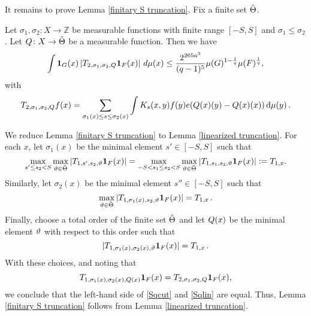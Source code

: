 It remains to prove Lemma \ref{finitary S truncation}.
Fix a finite set
$\tilde{\Theta}$.
\begin{lemma}\label{linearized truncation}
Let $\sigma_1,\sigma_2\colon X\to \mathbb{Z}$ be measurable functions with finite range
$[-S,S]$ and $\sigma_1\leq \sigma_2$.
Let ${Q}\colon X\to {\tilde{\Theta}}$ be a measurable function. Then we have
\begin{equation}  \label{Sqlin}
    \int \mathbf{1}_{G}(x)
    \left| {T}_{2,\sigma_1,\sigma_2,{Q}}\mathbf{1}_F(x)\right|\, d\mu(x)
    \le \frac{2^{265a^3}}{(q-1)^5} \mu(G)^{1-\frac{1}{q}} \mu(F)^{\frac{1}{q}},
\end{equation}
with
\begin{equation}\label{middles1}
    {T}_{2,\sigma_1,\sigma_2,{Q}}f(x)=\sum_{\sigma_1(x) \le s\le \sigma_2(x)}
    \int K_s(x,y)  f(y) e({Q}(x)(y) - {Q}(x)(x)) \, \mathrm{d}\mu(y)\,.
\end{equation}
\end{lemma}

We reduce Lemma \ref{finitary S truncation}  to
Lemma \ref{linearized truncation}.
For each $x$, let $\sigma_1(x)$ be the
minimal element $s'\in [-S,S]$ such that
\[\max_{s'\leq s_2<S}\max_{\vartheta\in\tilde{\Theta}}
| T_{1, s',s_2,\vartheta} \mathbf{1}_{F}(x)|
=
\max_{-S<s_1\le s_2<S}\max_{\vartheta\in\tilde{\Theta}}
| {T}_{1, s_1,s_2,\vartheta} \mathbf{1}_{F}(x)|:={T}_{1, x}.
\]
Similarly, let ${\sigma}_2(x)$ be the
minimal element $s''\in [-S,S]$ such that
\[\max_{\vartheta\in\tilde{\Theta}}
| {T}_{1, {\sigma}_1(x), s_2,\vartheta} \mathbf{1}_{F}(x)|
=
{T}_{1,x}\,.
\]
Finally, choose a total order of the finite set $\tilde{\Theta}$
and let ${Q}(x)$ be the minimal element $\vartheta$ with respect to this order such that
\[
| {T}_{1, {\sigma}_1(x),{\sigma}_2(x),\vartheta} \mathbf{1}_{F}(x)| =  {T}_{1,x}\,.
\]
With these choices, and noting that
\begin{equation*}
{T}_{1, {\sigma}_1(x),{\sigma}_2(x),{Q}(x)} \mathbf{1}_{F}(x)={T}_{2, {\sigma}_1,{\sigma}_2,{Q}} \mathbf{1}_{F}(x),
\end{equation*}
we conclude that the left-hand side of \eqref{Sqcut}
and \eqref{Sqlin} are equal. Thus, Lemma \ref{finitary S truncation}
follows from Lemma \ref{linearized truncation}.


